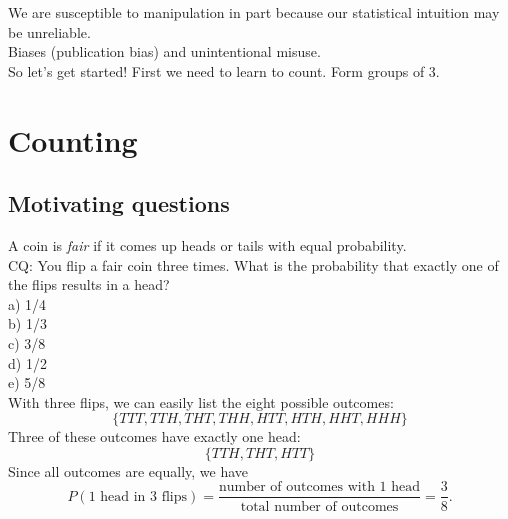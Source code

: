 \documentclass[12pt]{article}
\begin{document}


We are susceptible to manipulation in part because our statistical intuition may be unreliable. \\


Biases (publication bias) and unintentional misuse.\\

So let's get started!  First we need to learn to count.  Form groups of 3.


\section{Counting}
\subsection{Motivating questions}
A coin is {\em fair} if it comes up heads or tails with equal probability. \\
CQ: You flip a fair coin three times.  What is the probability that exactly one of the flips results in a head? \\
a) 1/4 \\
b) 1/3 \\
c) 3/8 \\
d) 1/2 \\
e) 5/8 \\

With three flips, we can easily list the eight possible outcomes:
$$\{TTT, TTH, THT, THH, HTT, HTH, HHT, HHH\}$$
Three of these outcomes have exactly one head:
$$\{TTH, THT, HTT\}$$
Since all outcomes are equally, we have
$$P(\text{1 head in 3 flips}) = \frac{\text{number of outcomes with 1 head}}{\text{total number of outcomes}} = \frac{3}{8}.$$ \\
\end{document}
